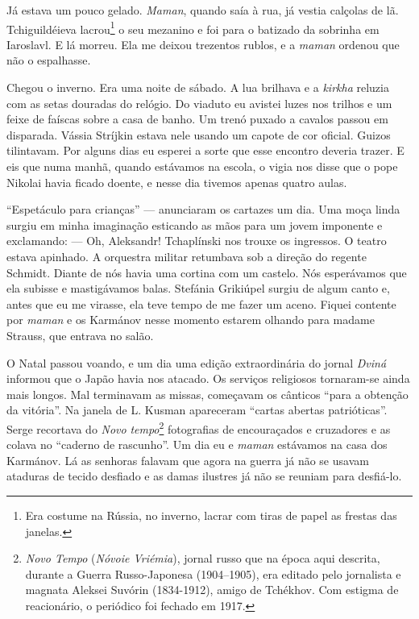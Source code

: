 Já estava um pouco gelado. \emph{Maman}, quando saía à rua, já vestia
calçolas de lã. Tchiguildéieva lacrou\footnote{Era costume na Rússia, no
  inverno, lacrar com tiras de papel as frestas das janelas.} o seu
mezanino e foi para o batizado da sobrinha em Iaroslavl. E lá morreu.
Ela me deixou trezentos rublos, e a \emph{maman} ordenou que não o
espalhasse.

Chegou o inverno. Era uma noite de sábado. A lua brilhava e a
\emph{kirkha} reluzia com as setas douradas do relógio. Do viaduto eu
avistei luzes nos trilhos e um feixe de faíscas sobre a casa de banho.
Um trenó puxado a cavalos passou em disparada. Vássia Stríjkin estava
nele usando um capote de cor oficial. Guizos tilintavam. Por alguns dias
eu esperei a sorte que esse encontro deveria trazer. E eis que numa
manhã, quando estávamos na escola, o vigia nos disse que o pope Nikolai
havia ficado doente, e nesse dia tivemos apenas quatro aulas.

``Espetáculo para crianças'' --- anunciaram os cartazes um dia. Uma moça
linda surgiu em minha imaginação esticando as mãos para um jovem
imponente e exclamando: --- Oh, Aleksandr! Tchaplínski nos trouxe os
ingressos. O teatro estava apinhado. A orquestra militar retumbava sob a
direção do regente Schmidt. Diante de nós havia uma cortina com um
castelo. Nós esperávamos que ela subisse e mastigávamos balas. Stefánia
Grikiúpel surgiu de algum canto e, antes que eu me virasse, ela teve
tempo de me fazer um aceno. Fiquei contente por \emph{maman} e os
Karmánov nesse momento estarem olhando para madame Strauss, que entrava
no salão.

O Natal passou voando, e um dia uma edição extraordinária do jornal
\emph{Dviná} informou que o Japão havia nos atacado. Os serviços
religiosos tornaram-se ainda mais longos. Mal terminavam as missas,
começavam os cânticos ``para a obtenção da vitória''. Na janela de L.
Kusman apareceram ``cartas abertas patrióticas''. Serge recortava do
\emph{Novo} \emph{tempo}\footnote{\emph{Novo Tempo} (\emph{Nóvoie
  Vriémia}), jornal russo que na época aqui descrita, durante a Guerra
  Russo-Japonesa (1904--1905), era editado pelo jornalista e magnata
  Aleksei Suvórin (1834-1912), amigo de Tchékhov. Com estigma de
  reacionário, o periódico foi fechado em 1917.} fotografias de
encouraçados e cruzadores e as colava no ``caderno de rascunho''. Um dia
eu e \emph{maman} estávamos na casa dos Karmánov. Lá as senhoras falavam
que agora na guerra já não se usavam ataduras de tecido desfiado e as
damas ilustres já não se reuniam para desfiá-lo.

